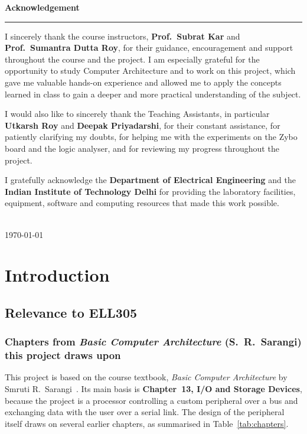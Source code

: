 \thispagestyle{empty}
\vspace*{8mm}
{\sffamily\bfseries\LARGE Acknowledgement\par}
\vspace{1mm}
\textcolor{lipicsyellow}{\rule{\linewidth}{1.2mm}}
\vspace{6mm}

I sincerely thank the course instructors, \textbf{Prof.~Subrat Kar} and
\textbf{Prof.~Sumantra Dutta Roy}, for their guidance, encouragement and support throughout
the course and the project. I am especially grateful for the opportunity to study Computer
Architecture and to work on this project, which gave me valuable hands-on experience and
allowed me to apply the concepts learned in class to gain a deeper and more practical
understanding of the subject.

I would also like to sincerely thank the Teaching Assistants, in particular
\textbf{Utkarsh Roy} and \textbf{Deepak Priyadarshi}, for their constant assistance, for
patiently clarifying my doubts, for helping me with the experiments on the Zybo board and the
logic analyser, and for reviewing my progress throughout the project.

I gratefully acknowledge the \textbf{Department of Electrical Engineering} and the
\textbf{Indian Institute of Technology Delhi} for providing the laboratory facilities,
equipment, software and computing resources that made this work possible.

\vspace{12mm}
\\
\today
\newpage

\tableofcontents
\listoffigures
\listoftables
\lstlistoflistings
\newpage

\section{Introduction}

\subsection{Relevance to ELL305}

\subsubsection*{Chapters from \emph{Basic Computer Architecture} (S.~R.~Sarangi) this project draws upon}
This project is based on the course textbook, \emph{Basic Computer Architecture} by
Smruti R.~Sarangi~\cite{sarangi}. Its main basis is \textbf{Chapter~13, I/O and Storage Devices},
because the project is a processor controlling a custom peripheral over a bus and exchanging data
with the user over a serial link. The design of the peripheral itself draws on several earlier
chapters, as summarised in Table~\ref{tab:chapters}.


